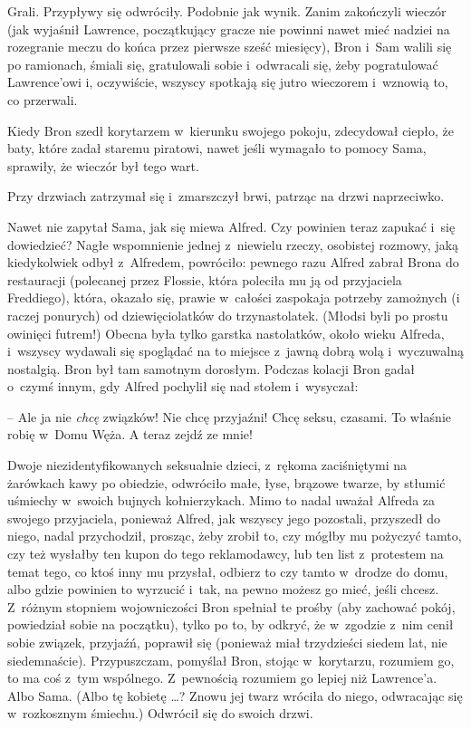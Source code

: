 \documentclass[oneside,polish,11pt,rmheadings]{mwbk}
\begin{document}
Grali. Przypływy się odwróciły. Podobnie jak wynik. Zanim zakończyli wieczór (jak wyjaśnił Lawrence, początkujący gracze nie powinni nawet mieć nadziei na rozegranie meczu do końca przez pierwsze sześć miesięcy), Bron i~Sam walili się po ramionach, śmiali się, gratulowali sobie i~odwracali się, żeby pogratulować Lawrence'owi i, oczywiście, wszyscy spotkają się jutro wieczorem i~wznowią to, co przerwali. 

Kiedy Bron szedł korytarzem w~kierunku swojego pokoju, zdecydował ciepło, że baty, które zadał staremu piratowi, nawet jeśli wymagało to pomocy Sama, sprawiły, że wieczór był tego wart. 

Przy drzwiach zatrzymał się i~zmarszczył brwi, patrząc na drzwi naprzeciwko. 

Nawet nie zapytał Sama, jak się miewa Alfred. Czy powinien teraz zapukać i~się dowiedzieć? Nagłe wspomnienie jednej z~niewielu rzeczy, osobistej rozmowy, jaką kiedykolwiek odbył z~Alfredem, powróciło: pewnego razu Alfred zabrał Brona do restauracji (polecanej przez Flossie, która poleciła mu ją od przyjaciela Freddiego), która, okazało się, prawie w~całości zaspokaja potrzeby zamożnych (i raczej ponurych) od dziewięciolatków do trzynastolatek. (Młodsi byli po prostu owinięci futrem!) Obecna była tylko garstka nastolatków, około wieku Alfreda, i~wszyscy wydawali się spoglądać na to miejsce z~jawną dobrą wolą i~wyczuwalną nostalgią. Bron był tam samotnym dorosłym. Podczas kolacji Bron gadał o~czymś innym, gdy Alfred pochylił się nad stołem i~wysyczał:  

-- Ale ja nie \textit{chcę }związków! Nie chcę przyjaźni! Chcę seksu, czasami. To właśnie robię w~Domu Węża. A teraz zejdź ze mnie! 

 Dwoje niezidentyfikowanych seksualnie dzieci, z~rękoma zaciśniętymi na żarówkach kawy po obiedzie, odwróciło małe, łyse, brązowe twarze, by stłumić uśmiechy w~swoich bujnych kołnierzykach. Mimo to nadal uważał Alfreda za swojego przyjaciela, ponieważ Alfred, jak wszyscy jego pozostali, przyszedł do niego, nadal przychodził, prosząc, żeby zrobił to, czy mógłby mu pożyczyć tamto, czy też wysłałby ten kupon do tego reklamodawcy, lub ten list z~protestem na temat tego, co ktoś inny mu przysłał, odbierz to czy tamto w~drodze do domu, albo gdzie powinien to wyrzucić i~tak, na pewno możesz go mieć, jeśli chcesz. Z~różnym stopniem wojowniczości Bron spełniał te prośby (aby zachować pokój, powiedział sobie na początku), tylko po to, by odkryć, że w~zgodzie z~nim cenił sobie związek, przyjaźń, poprawił się (ponieważ miał trzydzieści siedem lat, nie siedemnaście). Przypuszczam, pomyślał Bron, stojąc w~korytarzu, rozumiem go, to ma coś z~tym wspólnego. Z~pewnością rozumiem go lepiej niż Lawrence'a. Albo Sama. (Albo tę kobietę \ldots ? Znowu jej twarz wróciła do niego, odwracając się w~rozkosznym śmiechu.) Odwrócił się do swoich drzwi. 
\end{document}
